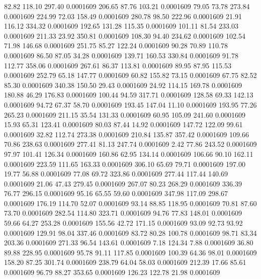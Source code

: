   82.82  118.10  297.40   0.0001609
 206.65   87.76  103.21   0.0001609
  79.05   73.78  273.84   0.0001609
 224.99   72.03  158.49   0.0001609
 280.78   98.50  222.96   0.0001609
  21.91  116.12  334.32   0.0001609
 192.65  131.28  115.35   0.0001609
 101.11   81.54  233.03   0.0001609
 211.33   23.92  350.81   0.0001609
 108.30   94.40  234.62   0.0001609
 102.54   71.98  146.68   0.0001609
 251.75   85.27  122.24   0.0001609
  90.28   70.89  110.78   0.0001609
  86.50   87.05   34.28   0.0001609
 139.71  160.53  330.84   0.0001609
  91.78  112.77  358.06   0.0001609
 267.61   86.37  113.81   0.0001609
  89.95   87.95  115.53   0.0001609
 252.79   65.18  147.77   0.0001609
  60.82  155.82   73.15   0.0001609
  67.75   82.52   85.30   0.0001609
 340.38  150.50   29.43   0.0001609
  24.92  114.15  169.78   0.0001609
 180.88   46.29  176.83   0.0001609
 100.44   94.59  317.71   0.0001609
 128.58   69.33  142.13   0.0001609
  94.72   67.37   58.70   0.0001609
 193.45  147.04   11.10   0.0001609
 193.95   77.26  265.23   0.0001609
 211.15   35.54  131.33   0.0001609
  60.95  105.09  241.60   0.0001609
  15.93   65.31  123.41   0.0001609
  80.03   87.44   14.92   0.0001609
 147.72  122.09   99.61   0.0001609
  32.82  112.74  273.38   0.0001609
 210.84  135.87  357.42   0.0001609
 109.66   70.86  238.63   0.0001609
 277.41   81.13  247.74   0.0001609
   2.42   77.86  243.52   0.0001609
  97.97  101.41  126.34   0.0001609
 160.86   62.95  134.14   0.0001609
 106.66   90.10  162.11   0.0001609
 223.59  111.65  163.33   0.0001609
 306.10   65.69   79.71   0.0001609
 197.00   19.77   56.88   0.0001609
  77.08   69.72  323.86   0.0001609
 277.44  117.44  140.69   0.0001609
  21.06   47.43  279.45   0.0001609
 267.07   80.23  268.29   0.0001609
 336.39   76.77  296.15   0.0001609
  95.16   65.55   59.60   0.0001609
 347.98  117.09  298.67   0.0001609
 176.19  114.70   52.07   0.0001609
  93.14   88.85  118.95   0.0001609
  70.81   87.60   73.70   0.0001609
 282.54  114.80  323.71   0.0001609
  94.76   77.83  148.01   0.0001609
  59.66   64.27  253.28   0.0001609
 155.56   42.72  171.15   0.0001609
  93.09   92.73   93.92   0.0001609
 129.91   98.04  337.46   0.0001609
  83.72   80.28  100.78   0.0001609
  98.71   83.34  203.36   0.0001609
 271.33   96.54  143.61   0.0001609
   7.18  124.34    7.88   0.0001609
  36.80   89.88  228.95   0.0001609
  95.78   91.11  117.85   0.0001609
 100.39   64.36   98.01   0.0001609
 158.20   87.25  301.74   0.0001609
 238.79   64.04   58.03   0.0001609
 212.39   17.66   85.61   0.0001609
  96.79   88.27  353.65   0.0001609
 126.23  122.78   21.98   0.0001609
